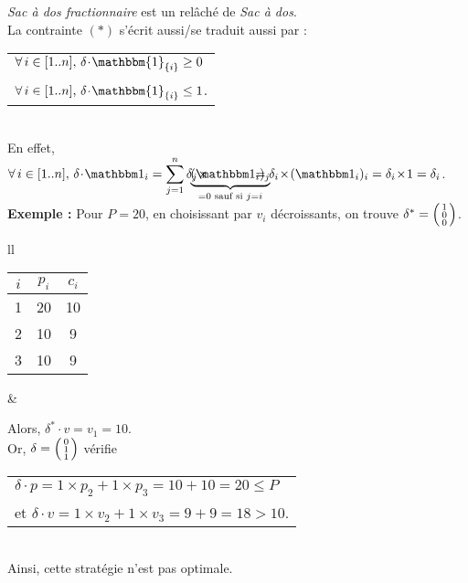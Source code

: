 \documentclass{scrartcl}
\newcommand{\elt}[1]{\textbf{#1}}
\newcommand{\dotp}{\! \cdot \!}
\newcommand{\x}{\! \times \!}
\newcommand{\nl}{\\[5mm]}
\newcommand{\1}{\bbm{1}}
\begin{document}
			\rem \textsf{\textit{Sac à dos fractionnaire}} est un relâché de \textsf{\textit{Sac à dos}}.
				\\[5mm]
			\rem La contrainte $(*)$ s'écrit aussi/se traduit aussi par : \hspace{-4.2mm}
				\begin{tabular}{l}
					\( \forall \, i \in [1..n], \, \delta \! \cdot \! \mathbbm{1}_{\{i\}} \geq 0 \) \\
					\( \forall \, i \in [1..n], \, \delta \! \cdot \! \mathbbm{1}_{\{i\}} \leq 1 \). \\
				\end{tabular}
				\\[-2mm]
			En effet, \( \forall \, i \in [1..n], \, \delta \dotp \1_{i} = \displaystyle \sum_{j=1}^{n} \delta_j \x \hspace{-5mm} \underbrace{(\1_i)_j}_{=0 \text{ sauf si } j = i} \hspace{-5mm} = \delta_i \x (\1_i)_i = \delta_i \x 1 = \delta_i \).
				\nl
			\elt{Exemple :} Pour $P = 20$, en choisissant par $v_i$ décroissants, on trouve \( \delta^* = \begin{psmallmatrix} 1 \\ 0 \\ 0 \end{psmallmatrix} \).
			\\[-3mm]
				\begin{tabular}[t]{ll}
					\begin{tabular}[t]{| c | c | c |}
						\hline
						$i$ & $p_i$ & $c_i$ \\ \hline
						1 & 20 & 10 \\ \hline
						2 & 10 & 9 \\ \hline
						3 & 10 & 9 \\ \hline
					\end{tabular}
					&
					\parbox[t]{120mm}{
						\vspace{1mm}
						Alors, $\delta^* \! \dotp v = v_1 = 10$. \\
						Or, \( \delta = \begin{psmallmatrix} 0 \\ 1 \\ 1 \end{psmallmatrix} \) vérifie
						\hspace{-8mm}
							\begin{tabular}[t]{l}
								\hspace{3.6mm} \( \delta \dotp p = 1 \x p_2 + 1 \x p_3 = 10 + 10 = 20 \leq P \) \\
								et \( \delta \dotp v = 1 \x v_2 + 1 \x v_3 = 9 + 9 = 18 > 10 \).
							\end{tabular} \\
						Ainsi, cette stratégie n'est pas optimale.
					}
				\end{tabular}
\end{document}
